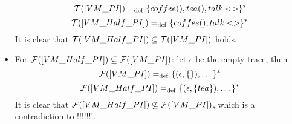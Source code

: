 \begin{prf}
\begin{itemize}
    \[\traces[VM\_PI] \define \{coffee(),tea(),talk<>\}^\ast\]
    \[\traces[VM\_Half\_PI] \define \{coffee(),talk<>\}^\ast\]
It is clear that $\traces[VM\_Half\_PI]\subseteq\traces[VM\_PI]$ holds. 

\item For $\failures[VM\_Half\_PI]\subseteq\failures[VM\_PI]$: let $\epsilon$ be the empty trace, then
    \[\failures[VM\_PI] \define \{(\epsilon,\{\}),\dots\}^\ast\]
    \[\failures[VM\_Half\_PI] \define \{(\epsilon,\{tea\}),\dots\}^\ast\]
It is clear that $\failures[VM\_Half\_PI]\not\subseteq\failures[VM\_PI]$, which is a contradiction to  !!!!!!!. 
\end{itemize}
\end{prf}
